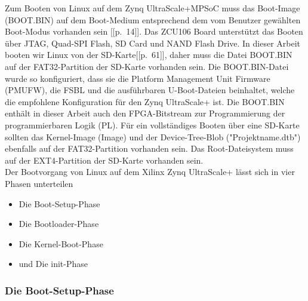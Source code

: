 Zum Booten von Linux auf dem Zynq UltraScale+MPSoC muss das Boot-Image (BOOT.BIN) auf dem Boot-Medium entsprechend dem vom Benutzer gewählten Boot-Modus vorhanden sein [\cite{Xilinx2017}[p.~14]]. Das ZCU106 Board unterstützt das Booten über JTAG, Quad-SPI Flash, SD Card und NAND Flash Drive. In dieser Arbeit booten wir Linux von der SD-Karte[\cite{Xilinx2020}[p.~61]], daher muss die Datei BOOT.BIN auf der FAT32-Partition der SD-Karte vorhanden sein. Die BOOT.BIN-Datei wurde so konfiguriert, dass sie die Platform Management Unit Firmware (PMUFW), die FSBL und die ausführbaren U-Boot-Dateien beinhaltet, welche die empfohlene Konfiguration für den Zynq UltraScale+ ist. Die BOOT.BIN enthält in dieser Arbeit auch den FPGA-Bitstream zur Programmierung der programmierbaren Logik (PL). Für ein vollständiges Booten über eine SD-Karte sollten das Kernel-Image (Image) und der Device-Tree-Blob ("Projektname.dtb") ebenfalls auf der FAT32-Partition vorhanden sein. Das Root-Dateisystem muss auf der EXT4-Partition der SD-Karte vorhanden sein.\\
Der Bootvorgang von Linux auf dem Xilinx Zynq UltraScale+ lässt sich in vier Phasen unterteilen

\begin{itemize}
	\item Die Boot-Setup-Phase
	\item Die Bootloader-Phase
	\item Die Kernel-Boot-Phase
	\item und Die \grqq init\grqq-Phase
\end{itemize}

\subsubsection{Die Boot-Setup-Phase}


